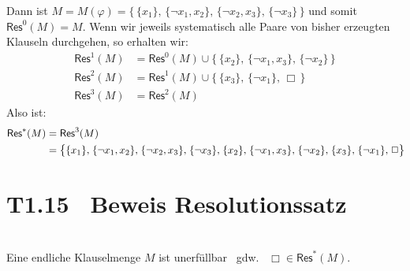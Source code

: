 \documentclass[fontsize=11pt, twoside=false, numbers=autoenddot]{scrbook}
\begin{document}
Dann ist $M = M(\varphi) = \big\{\, \{x_1\},\, \{\lnot x_1,x_2\},\, \{\lnot x_2,x_3\},\, \{\lnot x_3\}\, \big\}$
und somit $\textsf{Res}^0(M) = M$.
Wenn wir jeweils systematisch alle Paare von bisher erzeugten Klauseln durchgehen, so erhalten wir:
%
\begin{align*}
  \textsf{Res}^1(M) & = \textsf{Res}^0(M) \cup \big\{\, \{x_2\},\, \{\lnot x_1,x_3\},\, \{\lnot x_2\}\, \big\} \\
  \textsf{Res}^2(M) & = \textsf{Res}^1(M) \cup \big\{\, \{x_3\},\, \{\lnot x_1\},\, \Box\, \big\}              \\
  \textsf{Res}^3(M) & = \textsf{Res}^2(M)
\end{align*}
%
Also ist:
%
\begin{align*}
  \textsf{Res}^*(M) & = \textsf{Res}^3(M) \\
                    & = \big\{ \{x_1\},\;\! \{\lnot x_1,x_2\},\;\! \{\lnot x_2,x_3\},\;\! \{\lnot x_3\},\;\! \{x_2\},\;\! \{\lnot x_1,x_3\},\;\! \{\lnot x_2\},\;\!\{x_3\},\;\! \{\lnot x_1\},\;\! \Box \big\}\hspace*{-2pt}
\end{align*}

\newcommand{\TBewResSatz}{T1.15}
\section*{\hypertarget{TBewResSatz}{\TBewResSatz}~ Beweis Resolutionssatz}

 \\
Eine endliche Klauselmenge $M$ ist unerfüllbar ~gdw.~ $\Box \in \textsf{Res}^*(M)$.
\end{document}
